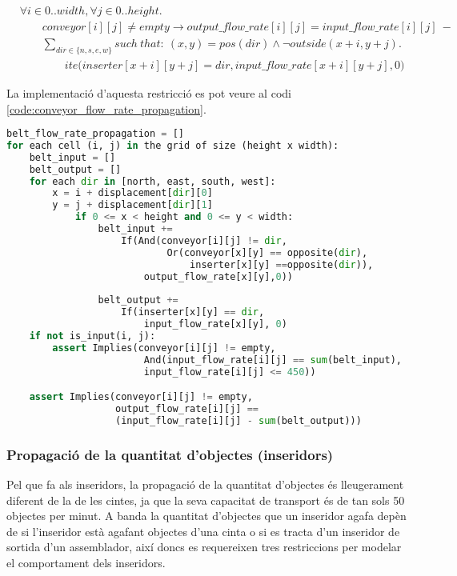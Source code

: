 \begin{align*}
    &\forall i \in 0..width, \forall j \in 0..height.\\
    &\qquad conveyor[i][j]\neq empty \rightarrow output\_flow\_rate[i][j] = input\_flow\_rate[i][j] \ -\\
    &\qquad \sum_{dir \in \{n, s, e, w\}} such \ that: \ (x, y)=pos(dir) \land \neg outside(x+i,y+j).\\
    &\qquad \qquad ite\Big(inserter[x+i][y+j] = dir, input\_flow\_rate[x+i][y+j], 0\Big)
\end{align*}

La implementació d'aquesta restricció es pot veure al codi \ref{code:conveyor_flow_rate_propagation}.

\begin{lstlisting}[language=Python, caption=Belt Item Flow Propagation, label=code:conveyor_flow_rate_propagation]
belt_flow_rate_propagation = []
for each cell (i, j) in the grid of size (height x width):
    belt_input = []
    belt_output = []
    for each dir in [north, east, south, west]:
        x = i + displacement[dir][0]
        y = j + displacement[dir][1]
            if 0 <= x < height and 0 <= y < width:
                belt_input +=
                    If(And(conveyor[i][j] != dir,
                            Or(conveyor[x][y] == opposite(dir),
                                inserter[x][y] ==opposite(dir)),
                        output_flow_rate[x][y],0))
                                            
                belt_output += 
                    If(inserter[x][y] == dir,
                        input_flow_rate[x][y], 0)
    if not is_input(i, j):
        assert Implies(conveyor[i][j] != empty,
                        And(input_flow_rate[i][j] == sum(belt_input),
                        input_flow_rate[i][j] <= 450))

    assert Implies(conveyor[i][j] != empty,
                   output_flow_rate[i][j] == 
                   (input_flow_rate[i][j] - sum(belt_output)))
\end{lstlisting}

\subsubsection{Propagació de la quantitat d'objectes (inseridors)}
Pel que fa als inseridors, la propagació de la quantitat d'objectes és lleugerament diferent de la de les cintes, ja que la seva capacitat de transport és de tan sols 50 objectes per minut. A banda la quantitat d'objectes que un inseridor agafa depèn de si l'inseridor està agafant objectes d'una cinta o si es tracta d'un inseridor de sortida d'un assemblador, així doncs es requereixen tres restriccions per modelar el comportament dels inseridors.\\

